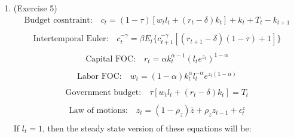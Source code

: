 \documentclass[letterpaper,12pt]{article}
\theoremstyle{definition}
\begin{document}
\begin{enumerate}
	\item(Exercise 5)\\
	\begin{equation} \label{eq1}
	\begin{split}
	\text{Budget cosntraint:} \quad c_{t} = (1 - \tau)[w_{t}l_{t} + (r_{t} - \delta)k_{t}] + k_{t} + T_{t} - k_{t + 1}\\
	\end{split}
	\end{equation}
	\begin{equation} \label{eq2}
	\begin{split}
	\text{Intertemporal Euler:} \quad c_{t}^{-\gamma} = \beta E_{t}\{  c_{t + 1}^{-\gamma}[(r_{t + 1} - \delta)(1 - \tau) + 1]\} \\
	\end{split}
	\end{equation}
	\begin{equation} \label{eq3}
	\begin{split}
	\text{Capital FOC:} \quad r_{t} = \alpha k_{t}^{\alpha - 1} (l_{t}e^{z_{t}})^{1 - \alpha} \\
	\end{split}
	\end{equation}
	\begin{equation} \label{eq4}
	\begin{split}
	\text{Labor FOC:} \quad w_{t} = (1 - \alpha)k_{t}^{\alpha} l_{t}^{- \alpha} e^{z_{t}(1 - \alpha)} \\
	\end{split}
	\end{equation}
	\begin{equation} \label{eq5}
	\begin{split}
	\text{Government budget:} \quad \tau[w_{t}l_{t} + (r_{t} - \delta)k_{t}] = T_{t}  \\
	\end{split}
	\end{equation}
	\begin{equation} \label{eq6}
	\begin{split}
	\text{Law of motions:} \quad z_{t} = (1 - \rho_{z})\bar{z} + \rho_{z}z_{t - 1} + \epsilon_{t}^{z} \\
	\end{split}
	\end{equation}
	If $l_{t} = 1$, then the steady state version of these equations will be: \\
	\begin{equation} \label{eq1}
	\begin{split}

\end{split}
\end{equation}
\end{enumerate}
\end{document}
